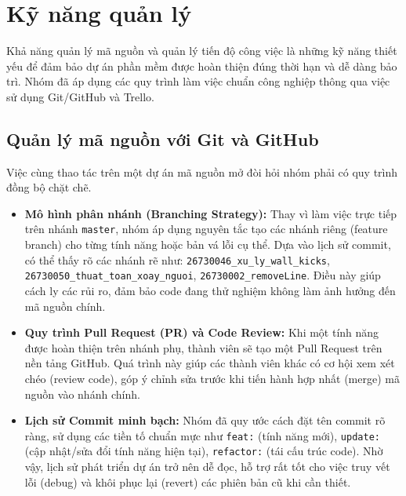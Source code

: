 \section{Kỹ năng quản lý}

Khả năng quản lý mã nguồn và quản lý tiến độ công việc là những kỹ năng thiết yếu để đảm bảo dự án phần mềm được hoàn thiện đúng thời hạn và dễ dàng bảo trì. Nhóm đã áp dụng các quy trình làm việc chuẩn công nghiệp thông qua việc sử dụng Git/GitHub và Trello.

\subsection{Quản lý mã nguồn với Git và GitHub}
Việc cùng thao tác trên một dự án mã nguồn mở đòi hỏi nhóm phải có quy trình đồng bộ chặt chẽ.
\begin{itemize}
    \item \textbf{Mô hình phân nhánh (Branching Strategy):} Thay vì làm việc trực tiếp trên nhánh \texttt{master}, nhóm áp dụng nguyên tắc tạo các nhánh riêng (feature branch) cho từng tính năng hoặc bản vá lỗi cụ thể. Dựa vào lịch sử commit, có thể thấy rõ các nhánh rẽ như: \texttt{26730046\_xu\_ly\_wall\_kicks}, \texttt{26730050\_thuat\_toan\_xoay\_nguoi}, \texttt{26730002\_removeLine}. Điều này giúp cách ly các rủi ro, đảm bảo code đang thử nghiệm không làm ảnh hưởng đến mã nguồn chính.
    \item \textbf{Quy trình Pull Request (PR) và Code Review:} Khi một tính năng được hoàn thiện trên nhánh phụ, thành viên sẽ tạo một Pull Request trên nền tảng GitHub. Quá trình này giúp các thành viên khác có cơ hội xem xét chéo (review code), góp ý chỉnh sửa trước khi tiến hành hợp nhất (merge) mã nguồn vào nhánh chính.
    \item \textbf{Lịch sử Commit minh bạch:} Nhóm đã quy ước cách đặt tên commit rõ ràng, sử dụng các tiền tố chuẩn mực như \texttt{feat:} (tính năng mới), \texttt{update:} (cập nhật/sửa đổi tính năng hiện tại), \texttt{refactor:} (tái cấu trúc code). Nhờ vậy, lịch sử phát triển dự án trở nên dễ đọc, hỗ trợ rất tốt cho việc truy vết lỗi (debug) và khôi phục lại (revert) các phiên bản cũ khi cần thiết.
\end{itemize}

